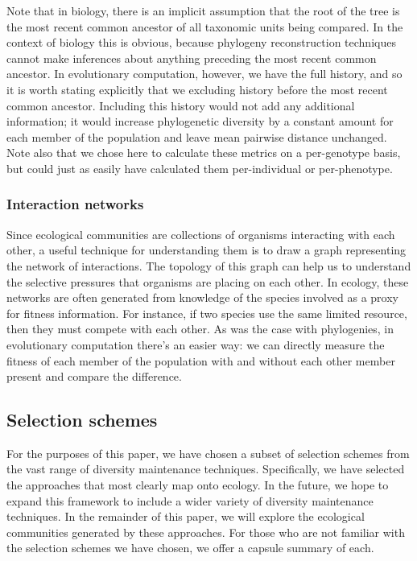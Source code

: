 Note that in biology, there is an implicit assumption that the root of the tree is the most recent common ancestor of all taxonomic units being compared. In the context of biology this is obvious, because phylogeny reconstruction techniques cannot make inferences about anything preceding the most recent common ancestor. In evolutionary computation, however, we have the full history, and so it is worth stating explicitly that we excluding history before the most recent common ancestor. Including this history would not add any additional information; it would increase phylogenetic diversity by a constant amount for each member of the population and leave mean pairwise distance unchanged. Note also that we chose here to calculate these metrics on a per-genotype basis, but could just as easily have calculated them per-individual or per-phenotype.

\subsubsection{Interaction networks}
Since ecological communities are collections of organisms interacting with each other, a useful technique for understanding them is to draw a graph representing the network of interactions. The topology of this graph can help us to understand the selective pressures that organisms are placing on each other. In ecology, these networks are often generated from knowledge of the species involved as a proxy for fitness information. For instance, if two species use the same limited resource, then they must compete with each other. As was the case with phylogenies, in evolutionary computation there's an easier way: we can directly measure the fitness of each member of the population with and without each other member present and compare the difference.

\subsection{Selection schemes}

For the purposes of this paper, we have chosen a subset of selection schemes from the vast range of diversity maintenance techniques. Specifically, we have selected the approaches that most clearly map onto ecology. In the future, we hope to expand this framework to include a wider variety of diversity maintenance techniques. In the remainder of this paper, we will explore the ecological communities generated by these approaches. For those who are not familiar with the selection schemes we have chosen, we offer a capsule summary of each.

